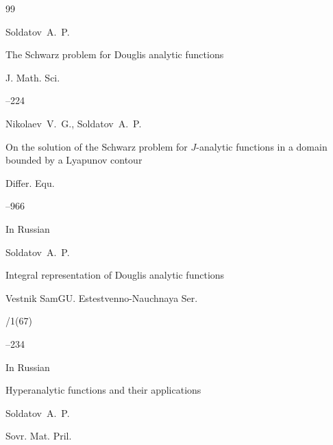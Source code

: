 \begin{thebibliography}{99}




\by Soldatov~A.~P.

\paper The Schwarz problem for Douglis analytic functions

\jour J. Math. Sci.



--224 











\by Nikolaev~V.~G., Soldatov~A.~P.

\paper On the solution of the Schwarz problem for $J$-analytic functions in a domain bounded by a Lyapunov contour 

\jour Differ. Equ. 



--966 







\lang In Russian

\by Soldatov~A.~P.

\paper Integral representation of Douglis analytic functions

\jour Vestnik SamGU. Estestvenno-Nauchnaya Ser.


/1(67)

--234






\lang In Russian

\paper Hyperanalytic functions and their applications

\by Soldatov~A.~P.

\jour Sovr. Mat. Pril.


\end{thebibliography}
